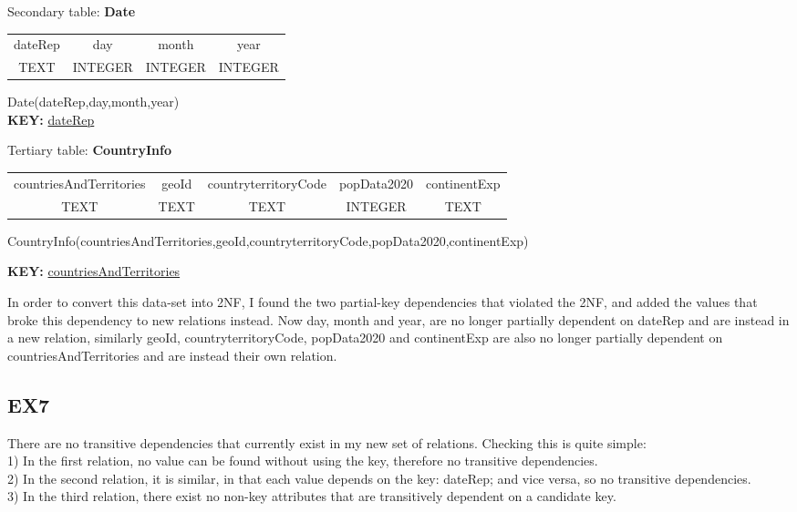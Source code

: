 \documentclass[10pt]{article}
\begin{document}
\begin{center}
    Secondary table: \textbf{Date}
    \begin{adjustbox}{width=250pt,center}
    \begin{tabular}{ |c|c|c|c| } 
    \hline
    dateRep & day & month & year\\
    TEXT & INTEGER & INTEGER & INTEGER\\
    \hline
    \end{tabular}
    \end{adjustbox}
    Date(dateRep,day,month,year)\\
    \textbf{KEY: } \underline{dateRep}

\end{center}

\begin{center}
    Tertiary table: \textbf{CountryInfo}
    \begin{adjustbox}{width=400pt,center}
    \begin{tabular}{ |c|c|c|c|c| } 
    \hline
    countriesAndTerritories & geoId & countryterritoryCode & popData2020 & continentExp\\
    TEXT & TEXT & TEXT & INTEGER & TEXT\\
    \hline
    \end{tabular}
    \end{adjustbox}
    {\scriptsize CountryInfo(countriesAndTerritories,geoId,countryterritoryCode,popData2020,continentExp) \par}
    \textbf{KEY: } \underline{countriesAndTerritories}
\end{center}
In order to convert this data-set into 2NF, I found the two partial-key dependencies that violated the 2NF, and added the values that broke this dependency to new relations instead. Now day, month and year, are no longer partially dependent on dateRep and are instead in a new relation, similarly geoId, countryterritoryCode, popData2020 and continentExp are also no longer partially dependent on countriesAndTerritories and are instead their own relation.

\subsection{EX7}
There are no transitive dependencies that currently exist in my new set of relations.
Checking this is quite simple: \\
1) In the first relation, no value can be found without using the key, therefore no transitive dependencies.\\
2) In the second relation, it is similar, in that each value depends on the key: dateRep; and vice versa, so no transitive dependencies.\\
3) In the third relation, there exist no non-key attributes that are transitively dependent on a candidate key.\\
\end{document}
